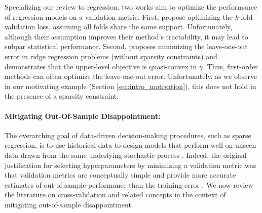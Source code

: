 \documentclass[mnsc,nonblindrev]{informs3} %
\begin{document}
Specializing our review to regression, two works aim to optimize the performance of regression models on a validation metric. First, \cite{takano2020best} propose optimizing the $k$-fold validation loss, assuming all folds share the same support. Unfortunately, although their assumption improves their method's tractability, it may lead to subpar statistical performance.
Second, \citet{stephenson2021can} proposes minimizing the leave-one-out error in ridge regression problems (without sparsity constraints) and demonstrates that the upper-level objective is quasi-convex in $\gamma$. Thus, first-order methods can often optimize the leave-one-out error. Unfortunately, as we observe in our motivating example {(\color{black}Section \ref{sec:intro_motivation})}, this does not hold in the presence of a sparsity constraint. %

\paragraph{Mitigating Out-Of-Sample Disappointment: } The overarching goal of data-driven decision-making procedures, such as sparse regression, is to use historical data to design models that perform well on unseen data drawn from the same underlying stochastic process \citep[][]{king1991epi}. Indeed, %
the original justification for selecting hyperparameters by minimizing a validation metric was that validation metrics are conceptually simple and provide more accurate estimates of out-of-sample performance than the training error \citep{stone1974cross}. We now review the literature on cross-validation and related concepts in the context of mitigating out-of-sample disappointment.%
\end{document}
